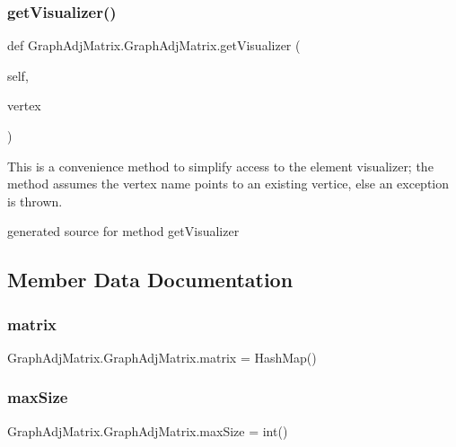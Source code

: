 \subsubsection{\texorpdfstring{get\+Visualizer()}{getVisualizer()}}
{\footnotesize\ttfamily def Graph\+Adj\+Matrix.\+Graph\+Adj\+Matrix.\+get\+Visualizer (\begin{DoxyParamCaption}\item[{}]{self,  }\item[{}]{vertex }\end{DoxyParamCaption})}



This is a convenience method to simplify access to the element visualizer; the method assumes the vertex name points to an existing vertice, else an exception is thrown. 

\begin{DoxyVerb}generated source for method getVisualizer \end{DoxyVerb}
 

\subsection{Member Data Documentation}
\hypertarget{class_graph_adj_matrix_1_1_graph_adj_matrix_aba658e4996d8a25b8c7260bb0f936ea7}{}\label{class_graph_adj_matrix_1_1_graph_adj_matrix_aba658e4996d8a25b8c7260bb0f936ea7} 
\subsubsection{\texorpdfstring{matrix}{matrix}}
{\footnotesize\ttfamily Graph\+Adj\+Matrix.\+Graph\+Adj\+Matrix.\+matrix = Hash\+Map()\hspace{0.3cm}{\ttfamily [static]}}

\hypertarget{class_graph_adj_matrix_1_1_graph_adj_matrix_a45edf0723e51301b7789e92514d128f4}{}\label{class_graph_adj_matrix_1_1_graph_adj_matrix_a45edf0723e51301b7789e92514d128f4} 
\subsubsection{\texorpdfstring{max\+Size}{maxSize}}
{\footnotesize\ttfamily Graph\+Adj\+Matrix.\+Graph\+Adj\+Matrix.\+max\+Size = int()\hspace{0.3cm}{\ttfamily [static]}}

